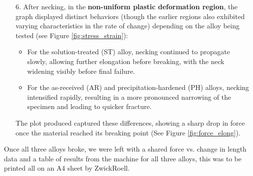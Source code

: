 \documentclass{article}
\begin{document}
\begin{enumerate}
    \item[6.] After necking, in the \textbf{non-uniform plastic deformation region}, the graph displayed distinct behaviors (though the earlier regions also exhibited varying characteristics in the rate of change) depending on the alloy being tested (see Figure \ref{fig:stress_strain}):
    \begin{itemize}
        \item For the solution-treated (ST) alloy, necking continued to propagate slowly, allowing further elongation before breaking, with the neck widening visibly before final failure.
        \item For the as-received (AR) and precipitation-hardened (PH) alloys, necking intensified rapidly, resulting in a more pronounced narrowing of the specimen and leading to quicker fracture.
    \end{itemize}
    The plot produced captured these differences, showing a sharp drop in force once the material reached its breaking point (See Figure \ref{fig:force_elong}).
\end{enumerate}
Once all three alloys broke, we were left with a shared force vs. change in length data and a table of results from the machine for all three alloys, this was to be printed all on an A4 sheet by ZwickRoell.\\ 
\vspace{3em}
\end{document}
